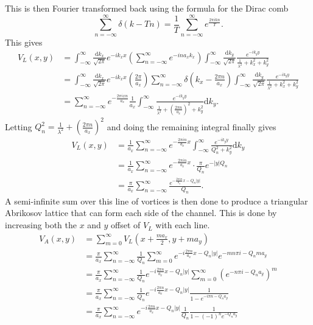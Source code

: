 \documentclass{article}
\numberwithin{equation}{section}
\begin{document}
This is then Fourier transformed back using the formula for the Dirac comb
\begin{equation}
    \sum_{n=-\infty}^\infty\delta(k-Tn) = \frac{1}{T}\sum_{n=-\infty}^\infty e^{\frac{2\pi ikn}{T}}.
\end{equation}
This gives
\begin{align*}
    V_L(x, y) &= \int_{-\infty}^\infty\frac{\mathrm{d}k_x}{\sqrt{2\pi}}e^{-ik_xx} \left(\sum_{n=-\infty}^\infty e^{-ina_xk_x}\right) \int_{-\infty}^\infty\frac{\mathrm{d}k_y}{\sqrt{2\pi}} \frac{e^{-ik_yy}}{\frac{1}{\lambda^2}+k_x^2+k_y^2} \\
    &= \int_{-\infty}^\infty\frac{\mathrm{d}k_x}{\sqrt{2\pi}}e^{-ik_xx} \left(\frac{2\pi}{a_x}\right)\sum_{n=-\infty}^\infty
    \delta\left(k_x - \frac{2\pi n}{a_x}\right) \int_{-\infty}^\infty\frac{\mathrm{d}k_y}{\sqrt{2\pi}} \frac{e^{-ik_yy}}{\frac{1}{\lambda^2}+k_x^2+k_y^2} \\
     &= \sum_{n=-\infty}^\infty e^{-\frac{2\pi ixn}{a_x}}\frac{1}{a_x} \int_{-\infty}^\infty\frac{e^{-ik_yy}} {\frac{1}{\lambda^2}+\left(\frac{2\pi n}{a_x}\right)^2+k_y^2}\mathrm{d}k_y.
\end{align*}
Letting $Q_n^2 = \frac{1}{\lambda^2} + \left(\frac{2\pi n}{a_x}\right)^2$ and doing the remaining integral finally gives
\begin{align}
    V_L(x, y) &= \frac{1}{a_x}\sum_{n=-\infty}^\infty e^{-\frac{2\pi in}{a_x}x} \int_{-\infty}^\infty\frac{e^{-ik_yy}} {Q_n^2+k_y^2}\mathrm{d}k_y \nonumber \\
    &= \frac{1}{a_x}\sum_{n=-\infty}^\infty e^{-\frac{2\pi in}{a_x}x}\cdot \frac{\pi}{Q_n}e^{-|y|Q_n} \nonumber \\
    &= \frac{\pi}{a_x}\sum_{n=-\infty}^\infty \frac{e^{-\frac{2\pi in}{a_x}x-Q_n|y|}}{Q_n}.
\end{align}
A semi-infinite sum over this line of vortices is then done to produce a triangular Abrikosov lattice that can form each side of the channel. This is done by increasing both the $x$ and $y$ offset of $V_L$ with each line.
\begin{align*}
    V_A(x, y) &= \sum_{m=0}^\infty V_L\left(x+\frac{ma_x}{2},y+ma_y\right) \\
    &= \frac{\pi}{a_x}\sum_{n=-\infty}^\infty\frac{1}{Q_n}\sum_{m=0}^\infty
    e^{-i\frac{2\pi n}{a_x}x-Q_n|y|}e^{-mn\pi i-Q_nma_y} \\
    &= \frac{\pi}{a_x}\sum_{n=-\infty}^\infty\frac{1}{Q_n}e^{-i\frac{2\pi n}{a_x}x-Q_n|y|} \sum_{m=0}^\infty\left(e^{-n\pi i-Q_na_y}\right)^m \\
    &= \frac{\pi}{a_x}\sum_{n=-\infty}^\infty\frac{1}{Q_n}e^{-i\frac{2\pi n}{a_x}x-Q_n|y|} \frac{1}{1-e^{-i\pi n-Q_na_y}} \\
    &= \frac{\pi}{a_x}\sum_{n=-\infty}^\infty e^{-i\frac{2\pi n}{a_x}x-Q_n|y|} \frac{1}{Q_n}\frac{1}{1-(-1)^ne^{-Q_na_y}}
\end{align*}
\end{document}
